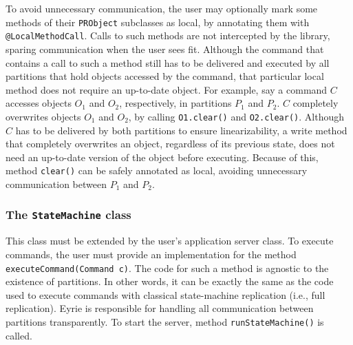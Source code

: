 
To avoid unnecessary communication, the user may optionally mark some methods of their \verb#PRObject# subclasses as local, by annotating them with \verb#@LocalMethodCall#. Calls to such methods are not intercepted by the library, sparing communication when the user sees fit. Although the command that contains a call to such a method still has to be delivered and executed by all partitions that hold objects accessed by the command, that particular local method does not require an up-to-date object. For example, say a command $C$ accesses objects $O_1$ and $O_2$, respectively, in partitions $P_1$ and $P_2$. $C$ completely overwrites objects $O_1$ and $O_2$, by calling \verb#O1.clear()# and \verb#O2.clear()#. Although $C$ has to be delivered by both partitions to ensure linearizability, a write method that completely overwrites an object, regardless of its previous state, does not need an up-to-date version of the object before executing. Because of this, method \verb#clear()# can be safely annotated as local, avoiding unnecessary communication between $P_1$ and $P_2$.


\subsubsection{The \texttt{StateMachine} class}

This class must be extended by the user's application server class. To execute commands, the user must provide an implementation for the method \verb#executeCommand(Command c)#. The code for such a method is agnostic to the existence of partitions. In other words, it can be exactly the same as the code used to execute commands with classical state-machine replication (i.e., full replication).
Eyrie is responsible for handling all communication between partitions transparently. 
To start the server, method \verb#runStateMachine()# is called.




